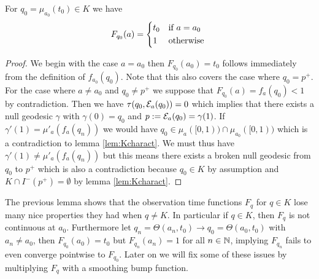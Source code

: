 \begin{lemma}\label{lem:boundaryF}
    For $q_0=\mu_{a_0}(t_0)\in K$ we have 
    \begin{equation*}
        F_{q_0}(a) = 
        \begin{cases*}
            t_0 & if $a=a_0$ \\
            1 & otherwise
        \end{cases*}
    \end{equation*}
\end{lemma}
\begin{proof}
    We begin with the case $a=a_0$ then $F_{q_0}(a_0)=t_0$ follows immediately from the definition of $f_{a_0}(q_0)$. Note that this also covers the case where $q_0=p^+$. For the case where $a\neq a_0$ and $q_0\neq p^+$ we suppose that $F_{q_0}(a)=f_a(q_0)<1$ by contradiction. Then we have $\tau(q_0,{\mathcal{E}}_a(q_0))=0$ which implies that there exists a null geodesic $\gamma$ with $\gamma(0)=q_0$ and $p:={\mathcal{E}}_a(q_0)=\gamma(1)$. If $\gamma'(1)=\mu'_a(f_a(q_n))$ we would have $q_0\in \mu_a([0,1)) \cap \mu_{a_0}([0,1))$ which is a contradiction to lemma \ref{lem:Kcharact}. We must thus have $\gamma'(1)\neq\mu'_a(f_a(q_n))$ but this means there exists a broken null geodesic from $q_0$ to $p^+$ which is also a contradiction because $q_0\in K$ by assumption and $K\cap I^-(p^+)=\emptyset$ by lemma \ref{lem:Kcharact}.
\end{proof}
\begin{remark}
    The previous lemma shows that the observation time functions $F_q$ for $q\in K$ lose many nice properties they had when $q\neq K$. In particular if $q\in K$, then $F_q$ is not continuous at $a_0$. Furthermore let $q_n=\Theta(a_n,t_0)\to q_0=\Theta(a_0,t_0)$ with $a_n \neq a_0$, then $F_{q_0}(a_0)=t_0$ but $F_{q_n}(a_n)=1$ for all $n\in \mathbb{N}$, implying $F_{q_n}$ fails to even converge pointwise to $F_{q_0}$. Later on we will fix some of these issues by multiplying $F_q$ with a smoothing bump function.
\end{remark}

